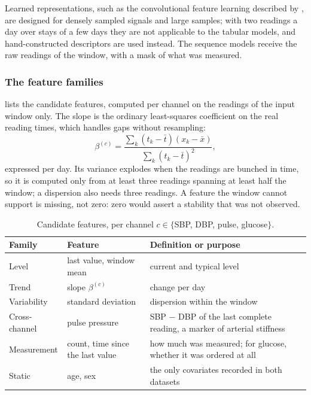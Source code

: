 Learned representations, such as the convolutional feature learning described by \textcite{liu2025review}, are designed for densely sampled signals and large samples; with two readings a day over stays of a few days they are not applicable to the tabular models, and hand-constructed descriptors are used instead. The sequence models receive the raw readings of the window, with a mask of what was measured.

\subsubsection{The feature families}\label{sec:features}\label{sec:descriptors}\label{sec:threshold-features}\label{sec:cross-channel}\label{sec:leak-boundary}\label{sec:threshold-table}

 lists the candidate features, computed per channel on the readings of the input window only. The slope is the ordinary least-squares coefficient on the real reading times, which handles gaps without resampling:
\begin{equation}
  \beta^{(c)} = \frac{\sum_{k}(t_k - \bar t)(x_k - \bar x)}{\sum_{k}(t_k - \bar t)^2},
\end{equation}
expressed per day. Its variance explodes when the readings are bunched in time, so it is computed only from at least three readings spanning at least half the window; a dispersion also needs three readings. A feature the window cannot support is missing, not zero: zero would assert a stability that was not observed.

\begin{table}[htbp]
\centering\footnotesize
\caption{Candidate features, per channel $c \in \{$SBP, DBP, pulse, glucose$\}$.}\label{tab:feature-set}\label{tab:threshold-features}\label{tab:cross-features}
\begin{tabularx}{\textwidth}{@{}>{\raggedright\arraybackslash}p{2.4cm} >{\raggedright\arraybackslash}p{4.2cm} X@{}}
\toprule
\textbf{Family} & \textbf{Feature} & \textbf{Definition or purpose} \\
\midrule
Level & last value, window mean & current and typical level \\
Trend & slope $\beta^{(c)}$ & change per day \\
Variability & standard deviation & dispersion within the window \\
Cross-channel & pulse pressure & SBP $-$ DBP of the last complete reading, a marker of arterial stiffness \\
Measurement & count, time since the last value & how much was measured; for glucose, whether it was ordered at all \\
Static & age, sex & the only covariates recorded in both datasets \\
\bottomrule
\end{tabularx}
\end{table}

